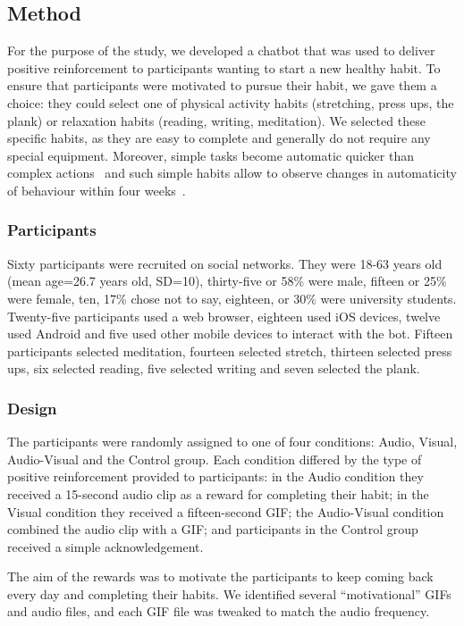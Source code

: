 \documentclass{scaffold/sigchi}
\begin{document}
\subsection{Method}
For the purpose of the study, we developed a chatbot that was used to deliver positive reinforcement to participants wanting to start a new healthy habit. To ensure that participants were motivated to pursue their habit, we gave them a choice: they could select one of physical activity habits (stretching, press ups, the plank) or relaxation habits (reading, writing, meditation). We selected these specific habits, as they are easy to complete and generally do not require any special equipment. Moreover, simple tasks become automatic quicker than complex actions~\cite{article_how_habits_formed_modelling_habit_formation} and such simple habits allow to observe changes in automaticity of behaviour within four weeks~\cite{article_beyond_self_tracking_designing_apps}.

\subsubsection{Participants}
Sixty participants were recruited on social networks. They were 18-63 years old (mean age=26.7 years old, SD=10), thirty-five or 58\% were male, fifteen or 25\% were female, ten, 17\% chose not to say, eighteen, or 30\% were university students. Twenty-five participants used a web browser, eighteen used iOS devices, twelve used Android and five used other mobile devices to interact with the bot. Fifteen participants selected meditation, fourteen selected stretch, thirteen selected press ups, six selected reading, five selected writing and seven selected the plank.

\subsubsection{Design}
The participants were randomly assigned to one of four conditions: Audio, Visual, Audio-Visual and the Control group. Each condition differed by the type of positive reinforcement provided to participants: in the Audio condition they received a 15-second audio clip as a reward for completing their habit; in the Visual condition they received a fifteen-second GIF; the Audio-Visual condition combined the audio clip with a GIF; and participants in the Control group received a simple acknowledgement. 

The aim of the rewards was to motivate the participants to keep coming back every day and completing their habits. We identified several ``motivational'' GIFs and audio files, and each GIF file was tweaked to match the audio frequency.
\end{document}
